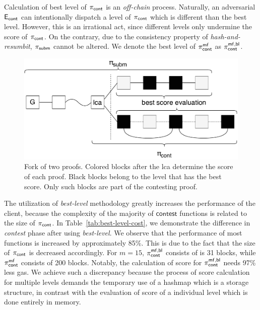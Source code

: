 Calculation of best level of $\mathsf{\pi_{cont}}$ is an \emph{off-chain} process. Naturally,
an adversarial $\mathsf{E_{cont}}$ can intentionally dispatch a level of $\mathsf{\pi_{cont}}$ which is
different than the best level. However, this is an irrational act, since
different levels only undermine the score of $\mathsf{\pi_{cont}}$. On the contrary, due to
the consistency property of \emph{hash-and-resumbit}, $\mathsf{\pi_{subm}}$ cannot be altered.
We denote the best level of $\mathsf{\pi_{cont}^{mf}}$ as $\mathsf{\pi_{cont}^{mf, bl}}$.

\begin{figure}[!h]
    \begin{center}
        \includegraphics[width=1\columnwidth]{figures/blocks-of-best-level.pdf}
    \end{center}
    \caption{Fork of two proofs. Colored blocks after the lca determine the
    score of each proof. Black blocks belong to the level that
    has the best score. Only such blocks are part of the contesting proof.}
    \label{fig:score-at-levels}
\end{figure}

The utilization of \emph{best-level} methodology greatly increases the
performance of the client, because the complexity of the majority of
$\textsf{contest}$ functions is related to the size of $\mathsf{\pi_{cont}}$. In
Table~\ref{tab:best-level-cost}, we demonstrate the difference in
\emph{contest} phase after using \emph{best-level}. We observe that the
performance of most functions is increased by approximately 85\%. This is due
to the fact that the size of $\mathsf{\pi_{cont}}$ is decreased accordingly. For $m=15$,
$\mathsf{\pi_{cont}^{mf, bl}}$ consists of is 31 blocks, while $\mathsf{\pi_{cont}^{mf}}$ consists of 200 blocks.
Notably, the calculation of score for $\mathsf{\pi_{cont}^{mf, bl}}$ needs 97\% less gas. We achieve
such a discrepancy because the process of score calculation for multiple levels
demands the temporary use of a hashmap which is a storage structure, in
contrast with the evaluation of score of a individual level which is done
entirely in memory.

